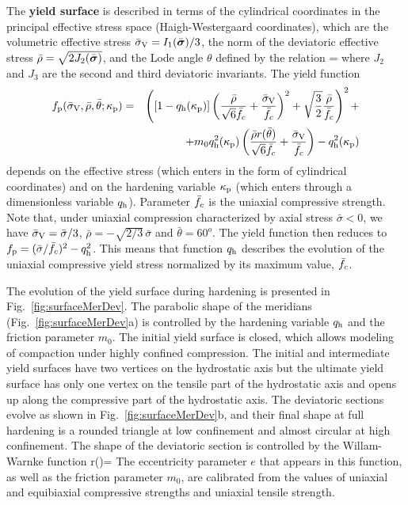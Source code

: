 \documentclass[a4paper]{article}
\newcommand{\mbf}[1]{\mbox{\boldmath$#1$}}
\newcommand{\bea}{\begin{eqnarray}}
\newcommand{\eea}{\end{eqnarray}}
\newcommand{\vsig}{\mbf{\sigma}}%
\begin{document}
The {\bf yield surface} is described in terms of the cylindrical coordinates in the principal effective stress space (Haigh-Westergaard coordinates), which are the volumetric effective stress $\bar{\sigma}_{\rm V} = {I_1(\bar{\vsig})}/{3}$, the norm of the deviatoric effective stress
$\bar{\rho} = \sqrt{2 J_2(\bar{\vsig})}$, 
and the Lode angle $\theta$ defined by the relation
\beq\label{lodeangle}
 \theta = 
\eeq
where $J_2$ and $J_3$ are the second and third deviatoric invariants.
The yield function
\bea\nonumber
f_{\rm p}(\bar\sigma_{\rm V},\bar{\rho},\bar{\theta};\kappa_{\rm p})&=&\left(\left[1-q_{\rm{h}}(\kappa_{\rm p})\right]\left( \frac{\bar{\rho}} {\sqrt{6}\fc} + \frac{\bar{\sigma}_{\rm V}} {\fc} \right)^2 + \sqrt{\frac{3}{2}} \frac {\bar{\rho}}{\fc} \right)^2 +\\
&& 
 +m_0 q_{\rm{h}}^2(\kappa_{\rm p}) \left(\frac{\bar{\rho}r(\bar{\theta}) }{\sqrt{6}\fc} + \frac{\bar{\sigma}_{\rm V}}{\fc} \right) - q_{\rm{h}}^2(\kappa_{\rm p})
\label{eq:yieldSurface}
\eea
depends on the effective stress (which enters in the form of cylindrical coordinates) and on the hardening variable $\kappa_{\rm p}$ (which enters through a dimensionless variable $q_{\rm h}$). Parameter $\bar{f}_c$ is the uniaxial compressive strength. 
Note that, under uniaxial compression characterized by axial stress 
$\bar{\sigma}<0$,  we have $\bar{\sigma}_{\rm V}=\bar{\sigma}/3$,
$\bar{\rho}=-\sqrt{2/3}\,\bar{\sigma}$ and $\bar{\theta}=60^o$. The yield function
then reduces to $f_{\rm p}=(\bar{\sigma}/\bar{f}_c)^2-q_{\rm{h}}^2$. This means that
function $q_{\rm{h}}$ describes the evolution of the uniaxial compressive
yield stress normalized by its maximum value, $\bar{f}_c$.

The evolution of the yield surface during hardening is presented in Fig.~\ref{fig:surfaceMerDev}.
The parabolic shape of the meridians (Fig.~\ref{fig:surfaceMerDev}a) is controlled by the hardening variable $q_{\rm h}$ and the friction parameter $m_0$.
The initial yield surface is closed, which allows modeling of compaction under highly confined compression. The initial and intermediate 
yield surfaces have two vertices on the hydrostatic axis but the ultimate yield surface has only one vertex 
on the tensile part of the hydrostatic axis and opens up along the compressive
part of the hydrostatic axis.
The deviatoric sections evolve as shown in Fig.~\ref{fig:surfaceMerDev}b,
and their final shape at full hardening
is a rounded triangle at low confinement and almost circular 
at high confinement.
The shape of the deviatoric section is controlled by the Willam-Warnke 
function 
\beq\label{bf103}
r(\theta)=
\eeq
The eccentricity parameter $e$ that appears in this function, as well as the friction parameter $m_0$, are calibrated from the values of uniaxial and equibiaxial compressive strengths and uniaxial tensile strength.
\end{document}
